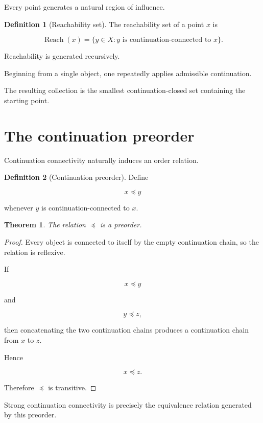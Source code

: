 \documentclass[13pt,openany]{book}
\theoremstyle{plain}
\newtheorem{theorem}{Theorem}[chapter]
\theoremstyle{definition}
\newtheorem{definition}{Definition}[chapter]
\begin{document}
Every point generates a natural region of influence.

\begin{definition}[Reachability set]
The reachability set of a point $x$ is

\[
\operatorname{Reach}(x)
=
\{
y\in X:
y
\text{ is continuation-connected to }
x
\}.
\]
\end{definition}

Reachability is generated recursively.

Beginning from a single object, one repeatedly applies admissible continuation.

The resulting collection is the smallest continuation-closed set containing the
starting point.

\section{The continuation preorder}

Continuation connectivity naturally induces an order relation.

\begin{definition}[Continuation preorder]
Define

\[
x\preceq y
\]

whenever $y$ is continuation-connected to $x$.
\end{definition}

\begin{theorem}
The relation $\preceq$ is a preorder.
\end{theorem}

\begin{proof}
Every object is connected to itself by the empty continuation chain, so the
relation is reflexive.

If

\[
x\preceq y
\]

and

\[
y\preceq z,
\]

then concatenating the two continuation chains produces a continuation chain
from $x$ to $z$.

Hence

\[
x\preceq z.
\]

Therefore $\preceq$ is transitive.
\end{proof}

Strong continuation connectivity is precisely the equivalence relation generated
by this preorder.
\end{document}
